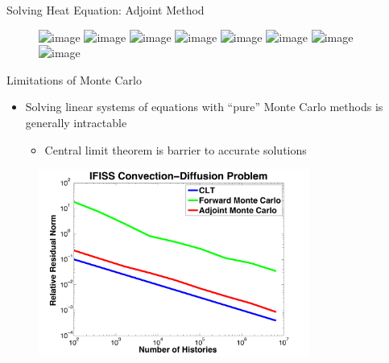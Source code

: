 \documentclass{beamer}
\begin{document}
\begin{frame}{Solving Heat Equation: Adjoint Method}

  \begin{figure}[h!]
    \begin{center}
      \includegraphics<1>[width=4in]{adjoint_1.png}
      \includegraphics<2>[width=4in]{adjoint_10.png}
      \includegraphics<3>[width=4in]{adjoint_100.png}
      \includegraphics<4>[width=4in]{adjoint_1000.png}
      \includegraphics<5>[width=4in]{adjoint_10000.png}
      \includegraphics<6>[width=4in]{adjoint_100000.png}
      \includegraphics<7>[width=4in]{adjoint_1000000.png}
      \includegraphics<8>[width=4in]{adjoint_10000000.png}
    \end{center}
    \caption{
    }
  \end{figure}
\end{frame}
\begin{frame}{Limitations of Monte Carlo}
\begin{itemize}
  \item Solving linear systems of equations with ``pure'' Monte Carlo methods
    is generally intractable
    \begin{itemize}
      \item Central limit theorem is barrier to accurate solutions
    \end{itemize}
\end{itemize}
\begin{figure}
  \centering
  \includegraphics[width=3.5in]{Ifiss_ConvDiff}
\end{figure}
\end{frame}
\end{document}
